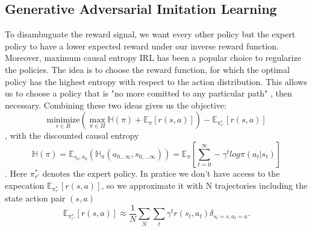 \subsection{Generative Adversarial Imitation Learning}
To disambuguate the reward signal, we want every other policy but the expert policy to have a lower expected reward under our inverse reward function. Moreover, 
maximum causal entropy IRL \cite{max_cause_ent_IRL} has been a popular choice to regularize the policies. The idea is to choose the reward function, for 
which the optimal policy has the highest entropy with respect to the action distribution. This allows us to choose a policy that is "no more comitted to any 
particular path" \cite[p.2]{max_cause_ent_IRL}, then necessary. Combining these two ideas gives us the objective:
\begin{equation}
    \underset{r \in R}{\text{minimize}} \left( \max_{\pi \in \Pi} \mathbb{H}(\pi) + \mathbb{E}_{\pi}[r(s, a)] \right) - \mathbb{E}_{\pi_{r'}^*}[r(s,a)]
\end{equation}
, with the discounted causal entropy 
\begin{equation}
    \mathbb{H}(\pi) = \mathbb{E}_{s_0, a_0} \left(\mathbb{H}_{\pi}(a_{0...\infty}, s_{0,...\infty})\right) = \mathbb{E}_{\pi}\left[\sum_{t=0}^\infty -\gamma^t log \pi(a_t|s_t)\right]
\end{equation}
\cite{InfCausalEnt}. Here $\pi_{r'}^*$ denotes the expert policy. In pratice we don't have access to the expecation $\mathbb{E}_{\pi_{r'}^*}[r(s,a)]$, so we approximate it with N 
trajectories including the state action pair $(s,a)$
\begin{equation}
    \mathbb{E}_{\pi_{r'}^*}[r(s,a)] \approx \frac{1}{N} \sum_N \sum_t \gamma^t r(s_t,a_t) \delta_{s_t=s, a_t=a}.
\end{equation}


